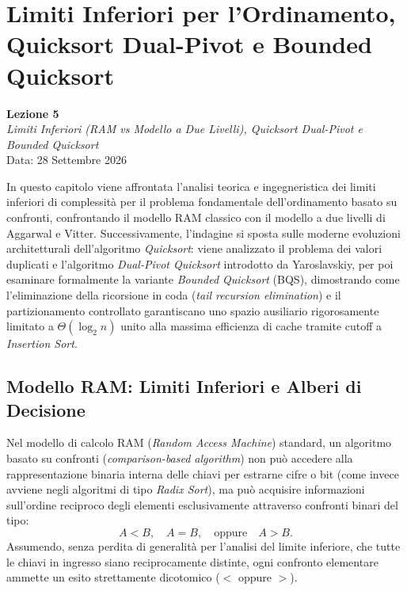 \chapter{Limiti Inferiori per l'Ordinamento, Quicksort Dual-Pivot e Bounded Quicksort}
\label{cha:lecture-five}

\begin{center}
  \textbf{Lezione 5}\\
  \emph{Limiti Inferiori (RAM vs Modello a Due Livelli), Quicksort Dual-Pivot e Bounded Quicksort}\\[0.5em]
  Data: 28 Settembre 2026
\end{center}

In questo capitolo viene affrontata l'analisi teorica e ingegneristica dei limiti inferiori di complessità per il problema fondamentale dell'ordinamento basato su confronti, confrontando il modello RAM classico con il modello a due livelli di Aggarwal e Vitter. Successivamente, l'indagine si sposta sulle moderne evoluzioni architetturali dell'algoritmo \textit{Quicksort}: viene analizzato il problema dei valori duplicati e l'algoritmo \textit{Dual-Pivot Quicksort} introdotto da Yaroslavskiy, per poi esaminare formalmente la variante \textit{Bounded Quicksort} (BQS), dimostrando come l'eliminazione della ricorsione in coda (\textit{tail recursion elimination}) e il partizionamento controllato garantiscano uno spazio ausiliario rigorosamente limitato a $\Theta(\log_2 n)$ unito alla massima efficienza di cache tramite cutoff a \textit{Insertion Sort}.

\FloatBarrier
\section{Modello RAM: Limiti Inferiori e Alberi di Decisione}
\label{sec:ram-lower-bounds}

Nel modello di calcolo RAM (\textit{Random Access Machine}) standard, un algoritmo basato su confronti (\textit{comparison-based algorithm}) non può accedere alla rappresentazione binaria interna delle chiavi per estrarne cifre o bit (come invece avviene negli algoritmi di tipo \textit{Radix Sort}), ma può acquisire informazioni sull'ordine reciproco degli elementi esclusivamente attraverso confronti binari del tipo:
\begin{equation}
  A < B, \quad A = B, \quad \text{oppure} \quad A > B.
\end{equation}
Assumendo, senza perdita di generalità per l'analisi del limite inferiore, che tutte le chiavi in ingresso siano reciprocamente distinte, ogni confronto elementare ammette un esito strettamente dicotomico ($<$ oppure $>$).

